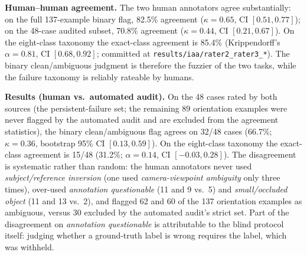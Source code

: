 \textbf{Human--human agreement.} The two human annotators agree
substantially: on the full 137-example binary flag, 82.5\% agreement
($\kappa{=}0.65$, CI $[0.51, 0.77]$); on the 48-case audited subset,
70.8\% agreement ($\kappa{=}0.44$, CI $[0.21, 0.67]$). On the eight-class
taxonomy the exact-class agreement is 85.4\% (Krippendorff's
$\alpha{=}0.81$, CI $[0.68, 0.92]$; committed at
\texttt{results/iaa/rater2\_rater3\_*}). The binary clean/ambiguous judgment
is therefore the fuzzier of the two tasks, while the failure taxonomy is
reliably rateable by humans.

\textbf{Results (human vs.\ automated audit).} On the 48 cases rated by both
sources (the persistent-failure set; the remaining 89 orientation examples
were never flagged by the automated audit and are excluded from the
agreement statistics), the binary clean/ambiguous flag agrees on 32/48 cases
(66.7\%; $\kappa{=}0.36$, bootstrap 95\% CI $[0.13, 0.59]$). On the
eight-class taxonomy the exact-class agreement is 15/48 (31.2\%;
$\alpha{=}0.14$, CI $[-0.03, 0.28]$). The disagreement is systematic rather
than random: the human annotators never used \emph{subject/reference
inversion} (one used \emph{camera-viewpoint ambiguity} only three times),
over-used \emph{annotation questionable} (11 and 9 vs.\ 5) and
\emph{small/occluded object} (11 and 13 vs.\ 2), and flagged 62 and 60 of the
137 orientation examples as ambiguous, versus 30 excluded by the automated
audit's strict set. Part of the disagreement on \emph{annotation
questionable} is attributable to the blind protocol itself: judging whether a
ground-truth label is wrong requires the label, which was withheld.

